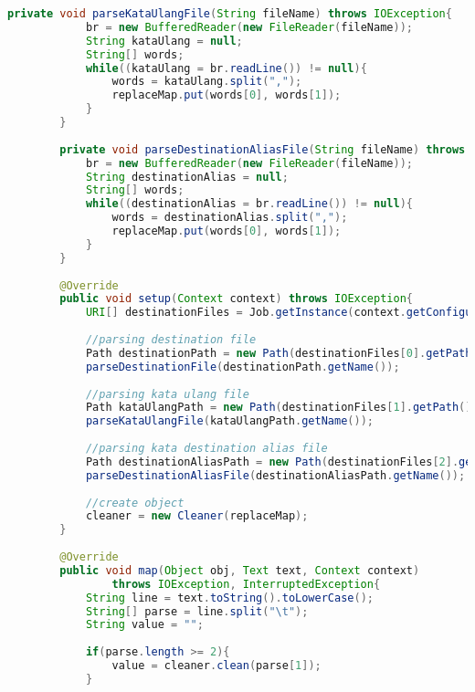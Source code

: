 \begin{lstlisting}[language=Java,basicstyle=\tiny,caption=Counter.java (MapReduce)]
        private void parseKataUlangFile(String fileName) throws IOException{
            br = new BufferedReader(new FileReader(fileName));
            String kataUlang = null;
            String[] words;
            while((kataUlang = br.readLine()) != null){
                words = kataUlang.split(",");
                replaceMap.put(words[0], words[1]);
            }
        }
        
        private void parseDestinationAliasFile(String fileName) throws IOException{
            br = new BufferedReader(new FileReader(fileName));
            String destinationAlias = null;
            String[] words;
            while((destinationAlias = br.readLine()) != null){
                words = destinationAlias.split(",");
                replaceMap.put(words[0], words[1]);
            }
        }
        
        @Override
        public void setup(Context context) throws IOException{
            URI[] destinationFiles = Job.getInstance(context.getConfiguration()).getCacheFiles();
            
            //parsing destination file
            Path destinationPath = new Path(destinationFiles[0].getPath());
            parseDestinationFile(destinationPath.getName());
            
            //parsing kata ulang file
            Path kataUlangPath = new Path(destinationFiles[1].getPath());
            parseKataUlangFile(kataUlangPath.getName());            
            
            //parsing kata destination alias file
            Path destinationAliasPath = new Path(destinationFiles[2].getPath());
            parseDestinationAliasFile(destinationAliasPath.getName());
            
            //create object
            cleaner = new Cleaner(replaceMap);
        }
        
        @Override
        public void map(Object obj, Text text, Context context) 
                throws IOException, InterruptedException{
            String line = text.toString().toLowerCase();
            String[] parse = line.split("\t");
            String value = "";
            
            if(parse.length >= 2){
                value = cleaner.clean(parse[1]); 
            }
            

\end{lstlisting}
